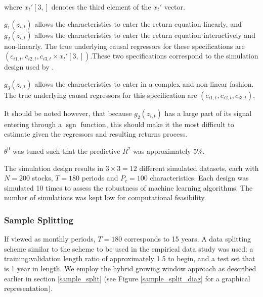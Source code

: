 \documentclass[11pt, a4paper, table]{article}
\begin{document}
where $x_{t}'[3,]$ denotes the third element of the $x_{t}'$ vector.

$g_1 \left(z_{i, t}\right)$ allows the characteristics to enter the return equation linearly, and $g_2 \left(z_{i, t}\right)$ allows the characteristics to enter the return equation interactively and non-linearly. The true underlying causal regressors for these specifications are $\left(c_{i 1, t}, c_{i 2, t}, c_{i 3, t} \times x_{t}'[3,]\right)$.These two specifications correspond to the simulation design used by \cite{gu_empirical_2018}. 

$g_3 \left(z_{i, t}\right)$ allows the characteristics to enter in a complex and non-linear fashion. The true underlying causal regressors for this specification are $\left(c_{i 1, t}, c_{i 2, t}, c_{i 3, t} \right)$. 

It should be noted however, that because $g_2 \left(z_{i, t}\right)$ has a large part of its signal entering through a $\operatorname{sgn}$ function, this should make it the most difficult to estimate given the regressors and resulting returns process.

$\theta^0$ was tuned such that the predictive $R^2$ was approximately 5\%.

The simulation design results in $3 \times 3 = 12$ different simulated datasets, each with $N = 200$ stocks, $T = 180$ periods and $P_c = 100$ characteristics. Each design was simulated 10 times to assess the robustness of machine learning algorithms. The number of simulations was kept low for computational feasibility.

\subsubsection{Sample Splitting}

If viewed as monthly periods, $T = 180$ corresponds to 15 years. A data splitting scheme similar to the scheme to be used in the empirical data study was used: a training:validation length ratio of approximately 1.5 to begin, and a test set that is 1 year in length. We employ the hybrid growing window approach as described earlier in section \ref{sample_split} (see Figure \ref{sample_split_diag} for a graphical representation).
\end{document}
